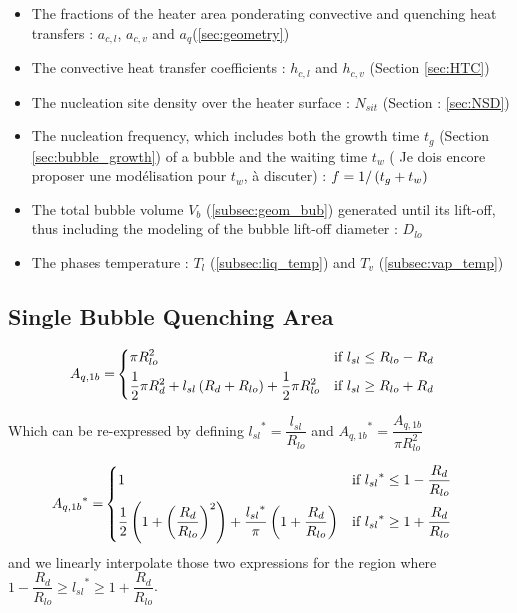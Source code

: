 \begin{itemize}
\item The fractions of the heater area ponderating convective and quenching heat transfers : $a_{c,l}$, $a_{c,v}$ and $a_{q}$(\ref{sec:geometry})
\item The convective heat transfer coefficients : $h_{c,l}$ and $h_{c,v}$ (Section \ref{sec:HTC})
\item The nucleation site density over the heater surface : $N_{sit}$ (Section : \ref{sec:NSD})
\item The nucleation frequency, which includes both the growth time $t_{g}$ (Section \ref{sec:bubble_growth}) of a bubble and the waiting time $t_{w}$ ({\color{red} Je dois encore proposer une modélisation pour $t_{w}$, à discuter}) : $f=1/\left( t_{g}+t_{w} \right)$
\item The total bubble volume $V_{b}$ (\ref{subsec:geom_bub}) generated until its lift-off, thus including the modeling of the bubble lift-off diameter : $D_{lo}$ 
\item The phases temperature : $T_{l}$ (\ref{subsec:liq_temp}) and $T_{v}$ (\ref{subsec:vap_temp})
\end{itemize}


\subsection{Single Bubble Quenching Area}

\begin{align}
A_{q,1b} = &
\begin{dcases}
\pi R_{lo}^{2} & \text{if } l_{sl}\leq R_{lo}-R_{d} \\
%
\frac{1}{2}\pi R_{d}^{2} + l_{sl}\parth{R_{d}+R_{lo}} + \frac{1}{2}\pi R_{lo}^{2} & \text{if } l_{sl} \geq R_{lo}+R_{d}
%
\end{dcases}
\end{align}

Which can be re-expressed by defining ${l_{sl}}^{*}=\dfrac{l_{sl}}{R_{lo}}$ and ${A_{q,1b}}^{*}=\dfrac{A_{q,1b}}{\pi R_{lo}^{2}}$

\begin{align}
{A_{q,1b}}^{*} = &
\begin{dcases}
1 & \text{if } {l_{sl}}^{*}\leq 1- \frac{R_{d}}{R_{lo}} \\
%
\frac{1}{2}\parth{1+\parth{\frac{R_{d}}{R_{lo}}}^{2} } + \frac{{l_{sl}}^{*}}{\pi}\parth{1+\frac{R_{d}}{R_{lo}}} & \text{if } {l_{sl}}^{*} \geq 1 + \frac{R_{d}}{R_{lo}}
\end{dcases}
\end{align}
and we linearly interpolate those two expressions for the region where $1-\dfrac{R_{d}}{R_{lo}}\geq {l_{sl}}^{*} \geq 1+\dfrac{R_{d}}{R_{lo}}$.


